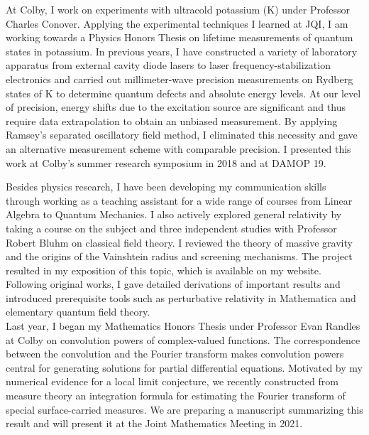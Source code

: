 \documentclass[12pt]{article}
\begin{document}
At Colby, I work on experiments with ultracold potassium (K) under Professor Charles Conover. Applying the experimental techniques I learned at JQI, I am working towards a Physics Honors Thesis on lifetime measurements of quantum states in potassium. In previous years, I have constructed a variety of laboratory apparatus from external cavity diode lasers to laser frequency-stabilization electronics and carried out millimeter-wave precision measurements on Rydberg states of K to determine quantum defects and absolute energy levels. At our level of precision, energy shifts due to the excitation source are significant and thus require data extrapolation to obtain an unbiased measurement. By applying Ramsey's separated oscillatory field method, I eliminated this necessity and gave an alternative measurement scheme with comparable precision. I presented this work at Colby's summer research symposium in 2018 and at DAMOP 19.  

Besides physics research, I have been developing my communication skills through working as a teaching assistant for a wide range of courses from Linear Algebra to Quantum Mechanics. I also actively explored general relativity by taking a course on the subject and three independent studies with Professor Robert Bluhm on classical field theory. I reviewed the theory of massive gravity and the origins of the Vainshtein radius and screening mechanisms. The project resulted in my exposition of this topic, which is available on my website. Following original works, I gave detailed derivations of important results and introduced prerequisite tools such as perturbative relativity in Mathematica and elementary quantum field theory. \\ 

Last year, I began my Mathematics Honors Thesis under Professor Evan Randles at Colby on convolution powers of complex-valued functions. The correspondence between the convolution and the Fourier transform makes convolution powers central for generating solutions for partial differential equations. Motivated by my numerical evidence for a local limit conjecture, we recently constructed from measure theory an integration formula for estimating the Fourier transform of special surface-carried measures. We are preparing a manuscript summarizing this result and will present it at the Joint Mathematics Meeting in 2021. \\ 
\end{document}
